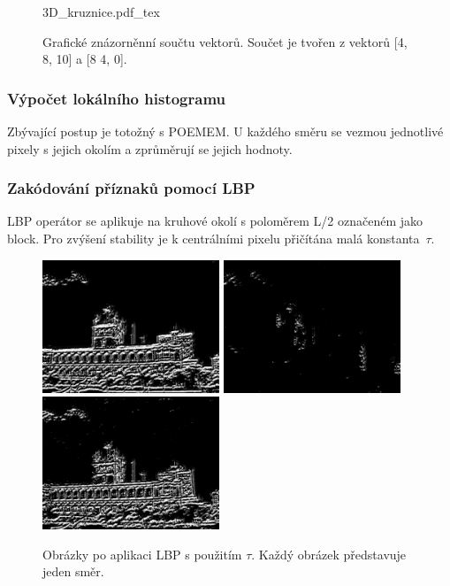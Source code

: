 \documentclass[czech,BP]{thesiskiv}
\begin{document}
\begin{figure}[H]
    \centering
    \def\svgwidth{\columnwidth}
    {3D_kruznice.pdf_tex} 
    \caption{Grafické znázorněnní součtu vektorů. Součet je tvořen z vektorů [4, 8, 10] a [8 4, 0].}
\end{figure}

\subsubsection{Výpočet lokálního histogramu}
\par Zbývající postup je totožný s POEMEM. U každého směru se vezmou jednotlivé pixely s jejich okolím a zprůměrují se jejich hodnoty. 

\subsubsection{Zakódování příznaků pomocí LBP}
\par LBP operátor se aplikuje na kruhové okolí s poloměrem L/2 označeném jako block. Pro zvýšení stability je k centrálními pixelu přičítána malá konstanta~$\tau$. 

\begin{figure}[H]
	\centering
	\includegraphics[width=150pt]{./img/lbp_3_1.jpg}
	\includegraphics[width=150pt]{./img/lbp_3_2.jpg}
	\includegraphics[width=150pt]{./img/lbp_3_3.jpg}
	\caption{Obrázky po aplikaci LBP s použitím $\tau$. Každý obrázek představuje jeden směr.}
\end{figure}
\end{document}
